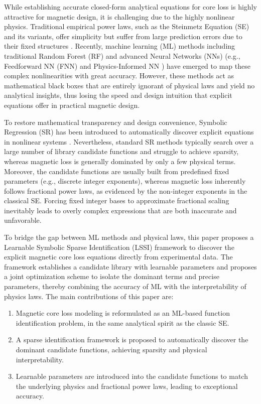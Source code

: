 \documentclass[lettersize,journal]{IEEEtran}
\begin{document}
While establishing accurate closed-form analytical equations for core loss is highly attractive for magnetic design, it is challenging due to the highly nonlinear physics. Traditional empirical power laws, such as the Steinmetz Equation (SE) and its variants, offer simplicity but suffer from large prediction errors due to their fixed structures \cite{1457110, 5955126}. Recently, machine learning (ML) methods including traditional Random Forest (RF) \cite{10509368} and advanced Neural Networks (NNs) (e.g., Feedforward NN (FNN) \cite{10502151} and Physics-Informed NN \cite{11126536}) have emerged to map these complex nonlinearities with great accuracy. However, these methods act as mathematical black boxes that are entirely ignorant of physical laws and yield no analytical insights, thus losing the speed and design intuition that explicit equations offer in practical magnetic design.

To restore mathematical transparency and design convenience, Symbolic Regression (SR) has been introduced to automatically discover explicit equations in nonlinear systems \cite{9180100, 11106929, 11592694}. Nevertheless, standard SR methods typically search over a large number of library candidate functions and struggle to achieve sparsity, whereas magnetic loss is generally dominated by only a few physical terms. Moreover, the candidate functions are usually built from predefined fixed parameters (e.g., discrete integer exponents), whereas magnetic loss inherently follows fractional power laws, as evidenced by the non-integer exponents in the classical SE. Forcing fixed integer bases to approximate fractional scaling inevitably leads to overly complex expressions that are both inaccurate and unfavorable.

To bridge the gap between ML methods and physical laws, this paper proposes a Learnable Symbolic Sparse Identification (LSSI) framework to discover the explicit magnetic core loss equations directly from experimental data. The framework establishes a candidate library with learnable parameters and proposes a joint optimization scheme to isolate the dominant terms and precise parameters, thereby combining the accuracy of ML with the interpretability of physics laws. The main contributions of this paper are:
\begin{enumerate}
    \item Magnetic core loss modeling is reformulated as an ML-based function identification problem, in the same analytical spirit as the classic SE.
    \item A sparse identification framework is proposed to automatically discover the dominant candidate
    functions, achieving sparsity and physical interpretability.
    \item Learnable parameters are introduced into the candidate functions to match the underlying physics and fractional power laws, leading to exceptional accuracy.
\end{enumerate}
\end{document}
